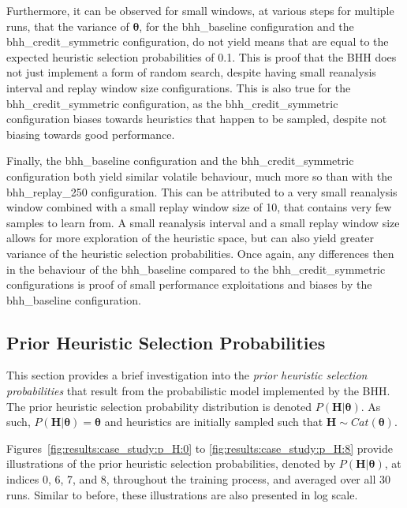 Furthermore, it can be observed for small windows, at various steps for multiple runs, that the variance of $\boldsymbol{\theta}$, for the bhh\_baseline configuration and the bhh\_credit\_symmetric configuration, do not yield means that are equal to the expected heuristic selection probabilities of 0.1. This is proof that the \acs{BHH} does not just implement a form of random search, despite having small reanalysis interval and replay window size configurations. This is also true for the bhh\_credit\_symmetric configuration, as the bhh\_credit\_symmetric configuration biases towards heuristics that happen to be sampled, despite not biasing towards good performance.

Finally, the bhh\_baseline configuration and the bhh\_credit\_symmetric configuration both yield similar volatile behaviour, much more so than with the bhh\_replay\_250 configuration. This can be attributed to a very small reanalysis window combined with a small replay window size of 10, that contains very few samples to learn from. A small reanalysis interval and a small replay window size allows for more exploration of the heuristic space, but can also yield greater variance of the heuristic selection probabilities. Once again, any differences then in the behaviour of the bhh\_baseline compared to the bhh\_credit\_symmetric configurations is proof of small performance exploitations and biases by the bhh\_baseline configuration.



\subsection{Prior Heuristic Selection Probabilities}\label{sec:results:case_study:prior_selec_prob}

This section provides a brief investigation into the \textit{prior heuristic selection probabilities} that result from the probabilistic model implemented by the \acs{BHH}. The prior heuristic selection probability distribution is denoted $P(\boldsymbol{H} \vert \boldsymbol{\theta})$. As such, $P(\boldsymbol{H} \vert \boldsymbol{\theta}) = \boldsymbol{\theta}$ and heuristics are initially sampled such that $\boldsymbol{H} \sim Cat(\boldsymbol{\theta})$.

Figures~\ref{fig:results:case_study:p_H:0} to \ref{fig:results:case_study:p_H:8} provide illustrations of the prior heuristic selection probabilities, denoted by $P(\boldsymbol{H} \vert \boldsymbol{\theta})$, at indices 0, 6, 7, and 8, throughout the training process, and averaged over all 30 runs. Similar to before, these illustrations are also presented in log scale.


